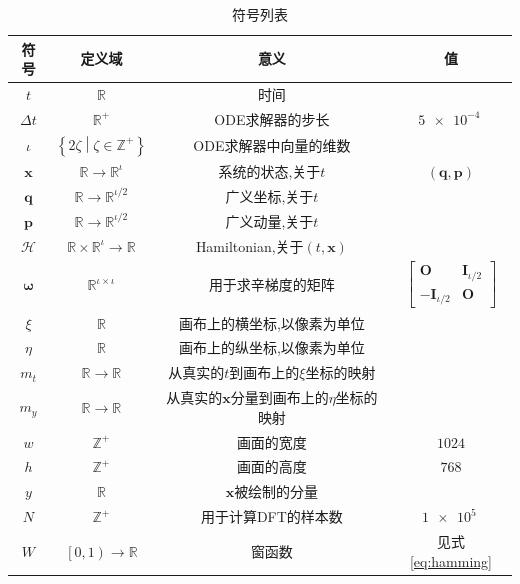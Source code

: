 \documentclass[12pt]{article}
\begin{document}
\begin{table}[h]
  \caption{符号列表}
  \label{tab:symbols}
  \centering
  \begin{tabular}{cccc}
    符号 & 定义域 & 意义 & 值\\
    \hline
    $t$ & $\mathbb R$ & 时间\\
    $\Delta t$ & $\mathbb R^+$ & ODE求解器的步长 & $\SI{5e-4}{}$\\
    $\iota$ & $\left\{2\zeta\middle|\zeta\in\mathbb Z^+\right\}$ & ODE求解器中向量的维数\\
    $\mathbf x$ & $\mathbb R\rightarrow\mathbb R^\iota$ & 系统的状态,关于$t$ & $\left(\mathbf q,\mathbf p\right)$\\
    $\mathbf q$ & $\mathbb R\rightarrow\mathbb R^{\iota/2}$ & 广义坐标,关于$t$\\
    $\mathbf p$ & $\mathbb R\rightarrow\mathbb R^{\iota/2}$ & 广义动量,关于$t$\\
    $\mathcal H$ & $\mathbb R\times\mathbb R^\iota\rightarrow\mathbb R$ & Hamiltonian,关于$\left(t,\mathbf x\right)$\\
    $\boldsymbol\omega$ & $\mathbb R^{\iota\times\iota}$ & 用于求辛梯度的矩阵 & $\left[\begin{matrix}
      \mathbf O & \mathbf I_{\iota/2}\\
      -\mathbf I_{\iota/2} & \mathbf O
    \end{matrix}\right]$\\
    $\xi$ & $\mathbb R$ & 画布上的横坐标,以像素为单位\\
    $\eta$ & $\mathbb R$ & 画布上的纵坐标,以像素为单位\\
    $m_t$ & $\mathbb R\rightarrow\mathbb R$ & 从真实的$t$到画布上的$\xi$坐标的映射\\
    $m_y$ & $\mathbb R\rightarrow\mathbb R$ & 从真实的$\mathbf x$分量到画布上的$\eta$坐标的映射\\
    $w$ & $\mathbb Z^+$ & 画面的宽度 & $1024$\\
    $h$ & $\mathbb Z^+$ & 画面的高度 & $768$\\
    $y$ & $\mathbb R$ & $\mathbf x$被绘制的分量\\
    $N$ & $\mathbb Z^+$ & 用于计算DFT的样本数 & $\SI{1e5}{}$\\
    $W$ & $\left[0,1\right)\rightarrow\mathbb R$ & 窗函数 & 见式\ref{eq:hamming}
  \end{tabular}
\end{table}
\end{document}
